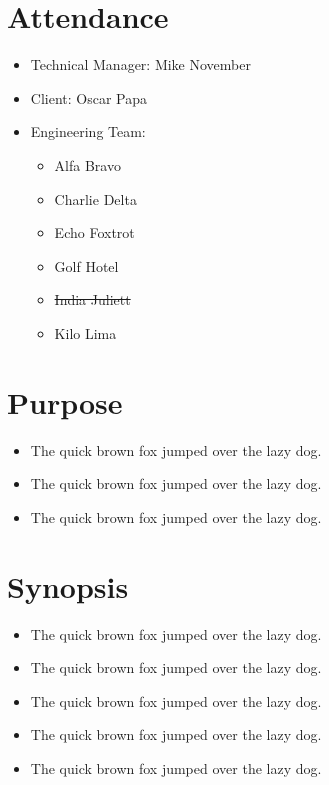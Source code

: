 \documentclass[12pt]{article}
\begin{document}

\section*{Attendance}
\begin{itemize}
    \item {Technical Manager: Mike November}
    \item {Client: Oscar Papa}
    \item Engineering Team:
    \begin{itemize}
        \item Alfa Bravo
        \item Charlie Delta
        \item Echo Foxtrot
        \item Golf Hotel
        \item \sout{India Juliett} %
        \item Kilo Lima
    \end{itemize}
\end{itemize}

\section*{Purpose}
\begin{itemize}
    \item The quick brown fox jumped over the lazy dog.
    \item The quick brown fox jumped over the lazy dog.
    \item The quick brown fox jumped over the lazy dog.
\end{itemize}

\section*{Synopsis}
\begin{itemize}
    \item The quick brown fox jumped over the lazy dog.
    \item The quick brown fox jumped over the lazy dog.
    \item The quick brown fox jumped over the lazy dog.
    \item The quick brown fox jumped over the lazy dog.
    \item The quick brown fox jumped over the lazy dog.
\end{itemize}
\end{document}
